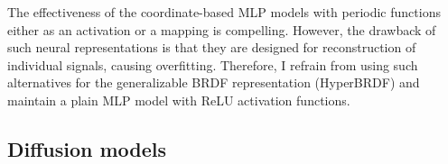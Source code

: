 The effectiveness of the coordinate-based MLP models with periodic functions either as an activation or a mapping is compelling. However, the drawback of such neural representations is that they are designed for reconstruction of individual signals, causing overfitting. Therefore, I refrain from using such alternatives for the generalizable BRDF representation (HyperBRDF) and maintain a plain MLP model with ReLU activation functions.

\subsection{Diffusion models}